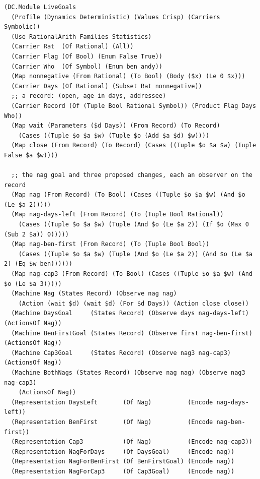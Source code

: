 \documentclass[11pt]{article}
\theoremstyle{definition}
\theoremstyle{plain}
\begin{document}
\begin{lstlisting}[style=mettamod]
(DC.Module LiveGoals
  (Profile (Dynamics Deterministic) (Values Crisp) (Carriers Symbolic))
  (Use RationalArith Families Statistics)
  (Carrier Rat  (Of Rational) (All))
  (Carrier Flag (Of Bool) (Enum False True))
  (Carrier Who  (Of Symbol) (Enum ben andy))
  (Map nonnegative (From Rational) (To Bool) (Body ($x) (Le 0 $x)))
  (Carrier Days (Of Rational) (Subset Rat nonnegative))
  ;; a record: (open, age in days, addressee)
  (Carrier Record (Of (Tuple Bool Rational Symbol)) (Product Flag Days Who))
  (Map wait (Parameters ($d Days)) (From Record) (To Record)
    (Cases ((Tuple $o $a $w) (Tuple $o (Add $a $d) $w))))
  (Map close (From Record) (To Record) (Cases ((Tuple $o $a $w) (Tuple False $a $w))))

  ;; the nag goal and three proposed changes, each an observer on the record
  (Map nag (From Record) (To Bool) (Cases ((Tuple $o $a $w) (And $o (Le $a 2)))))
  (Map nag-days-left (From Record) (To (Tuple Bool Rational))
    (Cases ((Tuple $o $a $w) (Tuple (And $o (Le $a 2)) (If $o (Max 0 (Sub 2 $a)) 0)))))
  (Map nag-ben-first (From Record) (To (Tuple Bool Bool))
    (Cases ((Tuple $o $a $w) (Tuple (And $o (Le $a 2)) (And $o (Le $a 2) (Eq $w ben))))))
  (Map nag-cap3 (From Record) (To Bool) (Cases ((Tuple $o $a $w) (And $o (Le $a 3)))))
  (Machine Nag (States Record) (Observe nag nag)
    (Action (wait $d) (wait $d) (For $d Days)) (Action close close))
  (Machine DaysGoal     (States Record) (Observe days nag-days-left) (ActionsOf Nag))
  (Machine BenFirstGoal (States Record) (Observe first nag-ben-first) (ActionsOf Nag))
  (Machine Cap3Goal     (States Record) (Observe nag3 nag-cap3)       (ActionsOf Nag))
  (Machine BothNags (States Record) (Observe nag nag) (Observe nag3 nag-cap3)
    (ActionsOf Nag))
  (Representation DaysLeft       (Of Nag)          (Encode nag-days-left))
  (Representation BenFirst       (Of Nag)          (Encode nag-ben-first))
  (Representation Cap3           (Of Nag)          (Encode nag-cap3))
  (Representation NagForDays     (Of DaysGoal)     (Encode nag))
  (Representation NagForBenFirst (Of BenFirstGoal) (Encode nag))
  (Representation NagForCap3     (Of Cap3Goal)     (Encode nag))


\end{lstlisting}
\end{document}
